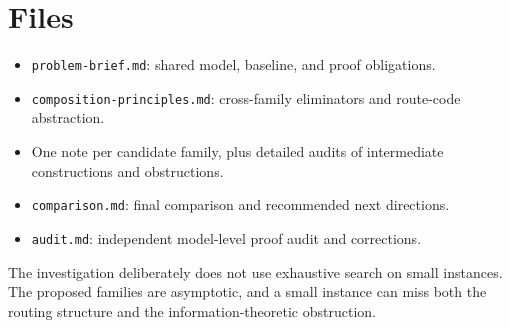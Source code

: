 \documentclass[11pt,a4paper]{article}
\begin{document}
\section*{Files}

\begin{itemize}

\item \nolinkurl{problem-brief.md}: shared model, baseline, and proof obligations.

\item \nolinkurl{composition-principles.md}: cross-family eliminators and route-code abstraction.

\item One note per candidate family, plus detailed audits of intermediate constructions and obstructions.

\item \nolinkurl{comparison.md}: final comparison and recommended next directions.

\item \nolinkurl{audit.md}: independent model-level proof audit and corrections.

\end{itemize}

The investigation deliberately does not use exhaustive search on small instances.  The proposed families are asymptotic, and a small instance can miss both the routing structure and the information-theoretic obstruction.
\end{document}
